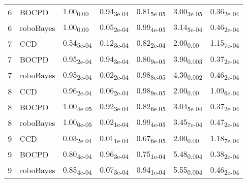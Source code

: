 \begin{table}[H]
\begin{tabular}{rllllll}
    6 & BOCPD & 1.00\textsubscript{0.00} & 0.94\textsubscript{3e-04} & 0.81\textsubscript{5e-05} & 3.00\textsubscript{3e-05} & 0.36\textsubscript{2e-04} \\ 
    6 & roboBayes & 1.00\textsubscript{0.00} & 0.05\textsubscript{2e-04} & 0.99\textsubscript{4e-05} & 3.14\textsubscript{5e-04} & 0.46\textsubscript{2e-04} \\ 
   \hline
  7 & CCD & 0.54\textsubscript{5e-04} & 0.12\textsubscript{3e-04} & 0.82\textsubscript{2e-04} & 2.00\textsubscript{0.00} & 1.15\textsubscript{7e-04} \\ 
    7 & BOCPD & 0.95\textsubscript{2e-04} & 0.94\textsubscript{3e-04} & 0.80\textsubscript{9e-05} & 3.90\textsubscript{0.003} & 0.37\textsubscript{2e-04} \\ 
    7 & roboBayes & 0.95\textsubscript{2e-04} & 0.02\textsubscript{2e-04} & 0.98\textsubscript{8e-05} & 4.30\textsubscript{0.002} & 0.46\textsubscript{2e-04} \\ 
   \hline
  8 & CCD & 0.96\textsubscript{2e-04} & 0.06\textsubscript{2e-04} & 0.98\textsubscript{9e-05} & 2.00\textsubscript{0.00} & 1.09\textsubscript{6e-04} \\ 
    8 & BOCPD & 1.00\textsubscript{4e-05} & 0.92\textsubscript{3e-04} & 0.82\textsubscript{6e-05} & 3.04\textsubscript{5e-04} & 0.37\textsubscript{2e-04} \\ 
    8 & roboBayes & 1.00\textsubscript{6e-05} & 0.02\textsubscript{1e-04} & 0.99\textsubscript{4e-05} & 3.45\textsubscript{7e-04} & 0.47\textsubscript{2e-04} \\ 
   \hline
  9 & CCD & 0.03\textsubscript{2e-04} & 0.01\textsubscript{1e-04} & 0.67\textsubscript{6e-05} & 2.00\textsubscript{0.00} & 1.18\textsubscript{7e-04} \\ 
    9 & BOCPD & 0.80\textsubscript{4e-04} & 0.96\textsubscript{3e-04} & 0.75\textsubscript{1e-04} & 5.48\textsubscript{0.004} & 0.38\textsubscript{2e-04} \\ 
    9 & roboBayes & 0.85\textsubscript{4e-04} & 0.07\textsubscript{3e-04} & 0.94\textsubscript{1e-04} & 5.55\textsubscript{0.004} & 0.46\textsubscript{2e-04} \\ 
   \hline
\end{tabular}
\end{table}
